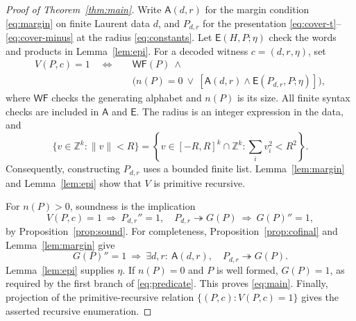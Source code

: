 \documentclass[12pt]{article}
\numberwithin{equation}{section}
\theoremstyle{definition}
\theoremstyle{remark}
\newcommand{\Z}{\mathbb Z}
\newcommand{\norm}[1]{\lVert #1\rVert}
\newcommand{\epito}{\twoheadrightarrow}
\begin{document}
\begin{proof}[Proof of Theorem~\ref{thm:main}]
Write $\mathsf A(d,r)$ for the margin condition
\eqref{eq:margin} on finite Laurent data $d$, and $P_{d,r}$ for
the presentation \eqref{eq:cover-t}--\eqref{eq:cover-minus}
at the radius \eqref{eq:constants}.
Let $\mathsf E(H,P;\eta)$ check the words and products in
Lemma~\ref{lem:epi}. For a decoded witness $c=(d,r,\eta)$, set
\begin{equation}
\label{eq:predicate}
\begin{split}
 V(P,c)=1\quad\Longleftrightarrow\quad&
 \mathsf{WF}(P)\ \land\\
 &\bigl(n(P)=0\ \lor\
 [\mathsf A(d,r)\land\mathsf E(P_{d,r},P;\eta)]\bigr),
\end{split}
\end{equation}
where $\mathsf{WF}$ checks the generating alphabet and $n(P)$ is its size.
All finite syntax checks are included in $\mathsf A$ and $\mathsf E$.
The radius is an integer expression in the data, and
\[
 \{v\in\Z^k:\norm v<R\}
 =
 \left\{v\in[-R,R]^k\cap\Z^k:\sum_i v_i^2<R^2\right\}.
\]
Consequently, constructing $P_{d,r}$ uses a bounded finite list.
Lemma~\ref{lem:margin} and Lemma~\ref{lem:epi} show that $V$
is primitive recursive.

For $n(P)>0$, soundness is the implication
\[
 V(P,c)=1
 \ \Longrightarrow\
 P_{d,r}''=1,\quad P_{d,r}\epito G(P)
 \ \Longrightarrow\ G(P)''=1,
\]
by Proposition~\ref{prop:sound}. For completeness,
Proposition~\ref{prop:cofinal} and Lemma~\ref{lem:margin} give
\[
 G(P)''=1
 \ \Longrightarrow\
 \exists d,r:\ \mathsf A(d,r),\quad P_{d,r}\epito G(P).
\]
Lemma~\ref{lem:epi} supplies $\eta$. If $n(P)=0$ and $P$ is
well formed, $G(P)=1$, as required by the first branch of
\eqref{eq:predicate}. This proves \eqref{eq:main}.
Finally, projection of the primitive-recursive relation
$\{(P,c):V(P,c)=1\}$ gives the asserted recursive enumeration.
\end{proof}
\end{document}

